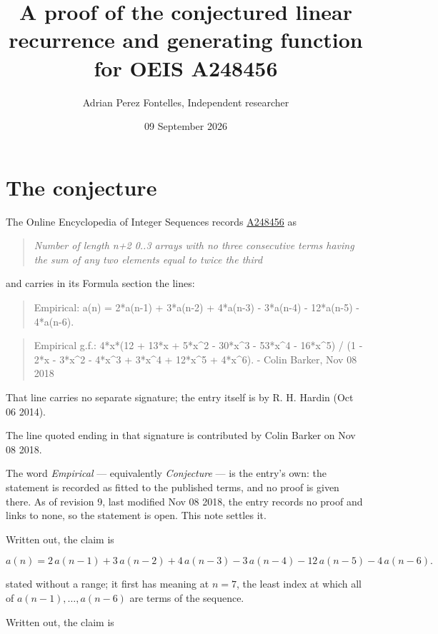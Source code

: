 \documentclass[11pt]{article}
\title{A proof of the conjectured linear recurrence and generating function for OEIS A248456}
\author{Adrian Perez Fontelles, Independent researcher}
\date{09 September 2026}
\theoremstyle{definition}
\begin{document}
\maketitle
\section{The conjecture}

The Online Encyclopedia of Integer Sequences records \href{https://oeis.org/A248456}{A248456} as

\begin{quote}\itshape Number of length n+2 0..3 arrays with no three consecutive terms having the sum of any two elements equal to twice the third\end{quote}

and carries in its Formula section the lines:

\begin{quote}\ttfamily Empirical: a(n) = 2*a(n-1) + 3*a(n-2) + 4*a(n-3) - 3*a(n-4) - 12*a(n-5) - 4*a(n-6).\end{quote}

\begin{quote}\ttfamily Empirical g.f.: 4*x*(12 + 13*x + 5*x\textasciicircum{}2 - 30*x\textasciicircum{}3 - 53*x\textasciicircum{}4 - 16*x\textasciicircum{}5) / (1 - 2*x - 3*x\textasciicircum{}2 - 4*x\textasciicircum{}3 + 3*x\textasciicircum{}4 + 12*x\textasciicircum{}5 + 4*x\textasciicircum{}6). - Colin Barker, Nov 08 2018\end{quote}

That line carries no separate signature; the entry itself is by R. H. Hardin (Oct 06 2014).

The line quoted ending in that signature is contributed by Colin Barker on Nov 08 2018.

The word {\itshape Empirical} --- equivalently {\itshape Conjecture} --- is the entry's own: the statement is recorded as fitted to the published terms, and no proof is given there. As of revision 9, last modified Nov 08 2018, the entry records no proof and links to none, so the statement is open. This note settles it.

Written out, the claim is

\[a(n) = 2\,a(n-1) + 3\,a(n-2) + 4\,a(n-3) - 3\,a(n-4) - 12\,a(n-5) - 4\,a(n-6).\]

stated without a range; it first has meaning at $n = 7$, the least index at which all of $a(n-1),\dots,a(n-6)$ are terms of the sequence.

Written out, the claim is
\end{document}
